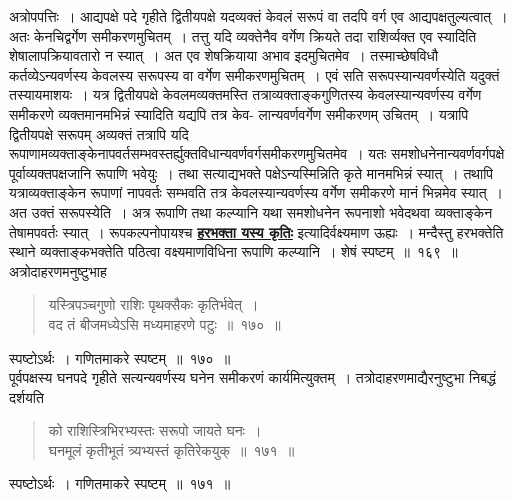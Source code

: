 \documentclass[11pt, openany]{book}
\begin{document}
\vspace{-4mm}
 अत्रोपपत्तिः~। आद्यपक्षे पदे गृहीते द्वितीयपक्षे यदव्यक्तं केवलं सरूपं
वा तदपि  वर्ग एव आद्यपक्षतुल्यत्वात्~। अतः केनचिद्वर्गेण समीकरणमुचितम्~। तत्तु
यदि  व्यक्तेनैव वर्गेण क्रियते तदा राशिर्व्यक्त एव स्यादिति
शेषालापक्रियावतारो न
 स्यात्~। अत एव शेषक्रियाया अभाव इदमुचितमेव~। तस्माच्छेषविधौ
कर्तव्येऽन्यवर्णस्य
 केवलस्य सरूपस्य वा वर्गेण समीकरणमुचितम्~। एवं सति सरूपस्यान्यवर्णस्येति यदुक्तं तस्यायमाशयः~। यत्र द्वितीयपक्षे केवलमव्यक्तमस्ति
तत्राव्यक्ताङ्कगुणितस्य केवलस्यान्यवर्णस्य वर्गेण समीकरणे व्यक्तमानमभिन्नं स्यादिति
यद्यपि तत्र केव-
\newpage
\noindent लान्यवर्णवर्गेण समीकरणम् उचितम्~। यत्रापि द्वितीयपक्षे सरूपम् अव्यक्तं तत्रापि यदि 
रूपाणामव्यक्ताङ्केनापवर्तसम्भवस्तर्ह्युक्तविधान्यवर्णवर्गसमीकरणमुचितमेव~। यतः समशोधनेनान्यवर्णवर्गपक्षे पूर्वाव्यक्तपक्षजानि रूपाणि भवेयुः~। तथा
सत्याद्यभक्ते पक्षेऽन्यस्मिन्निति कृते मानमभिन्नं स्यात्~। तथापि यत्राव्यक्ताङ्केन रूपाणां
नापवर्तः सम्भवति
 तत्र केवलस्यान्यवर्णस्य वर्गेण समीकरणे मानं भिन्नमेव स्यात्~। अत उक्तं
सरूपस्येति~। अत्र रूपाणि तथा कल्प्यानि यथा समशोधनेन रूपनाशो भवेदथवा
व्यक्ताङ्केन तेषामपवर्तः स्यात्~। रूपकल्पनोपायश्च \hyperref[178]{\textbf{हरभक्ता यस्य कृतिः}}
इत्यादिर्वक्ष्यमाण ऊह्यः~। मन्दैस्तु हरभक्तेति स्थाने व्यक्ताङ्कभक्तेति पठित्वा
वक्ष्यमाणविधिना रूपाणि कल्प्यानि~। शेषं स्पष्टम्~॥~१६९~॥~\\

\vspace{-2mm}
 अत्रोदाहरणमनुष्टुभाह\textendash
 
 \label{170}
\begin{quote}
    \eg 
     यस्त्रिपञ्चगुणो राशिः पृथक्सैकः कृतिर्भवेत्~। \\
 वद तं बीजमध्येऽसि मध्यमाहरणे पटुः~॥~१७०~॥~
\end{quote}

 स्पष्टोऽर्थः~। गणितमाकरे स्पष्टम्~॥~१७०~॥~\\

\vspace{-2mm}
 पूर्वपक्षस्य घनपदे गृहीते सत्यन्यवर्णस्य घनेन समीकरणं कार्यमित्युक्तम्~।
 तत्रोदाहरणमाद्यैरनुष्टुभा निबद्धं दर्शयति\textendash
\begin{quote}
    \eg 
    को राशिस्त्रिभिरभ्यस्तः सरूपो जायते घनः~। \\
 घनमूलं कृतीभूतं त्र्यभ्यस्तं कृतिरेकयुक्~॥~१७१~॥~
\end{quote}
  
 स्पष्टोऽर्थः~। गणितमाकरे स्पष्टम्~॥~१७१~॥~\\
\end{document}
